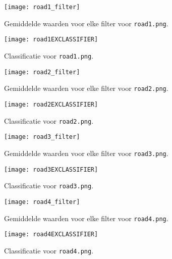 \documentclass{article}
\begin{document}
\begin{figure}[ht]
	\begin{minipage}{0.48\textwidth}
		\texttt{[image: road1\_filter]}
		\caption{Gemiddelde waarden voor elke filter voor \texttt{road1.png}.}
	\end{minipage}
	\begin{minipage}{0.48\textwidth}
		\texttt{[image: road1EXCLASSIFIER]}
		\caption{Classificatie voor \texttt{road1.png}.}
	\end{minipage}

\end{figure}
\begin{figure}[ht]
	\begin{minipage}{0.48\textwidth}
		\texttt{[image: road2\_filter]}
		\caption{Gemiddelde waarden voor elke filter voor \texttt{road2.png}.}
	\end{minipage}
	\begin{minipage}{0.48\textwidth}
		\texttt{[image: road2EXCLASSIFIER]}
		\caption{Classificatie voor \texttt{road2.png}.}
	\end{minipage}
	
\end{figure}
\begin{figure}[ht]
	\begin{minipage}{0.48\textwidth}
		\texttt{[image: road3\_filter]}
		\caption{Gemiddelde waarden voor elke filter voor \texttt{road3.png}.}
	\end{minipage}
	\begin{minipage}{0.48\textwidth}
		\texttt{[image: road3EXCLASSIFIER]}
		\caption{Classificatie voor \texttt{road3.png}.}
	\end{minipage}
	
\end{figure}
\begin{figure}[ht]
	\begin{minipage}{0.48\textwidth}
		\texttt{[image: road4\_filter]}
		\caption{Gemiddelde waarden voor elke filter voor \texttt{road4.png}.}
	\end{minipage}
	\begin{minipage}{0.48\textwidth}
		\texttt{[image: road4EXCLASSIFIER]}
		\caption{Classificatie voor \texttt{road4.png}.}
	\end{minipage}
	
\end{figure}


	
\end{document}
